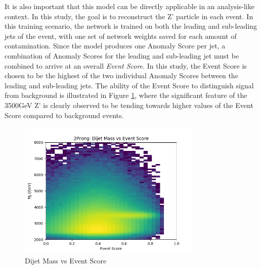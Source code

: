 \documentclass[12pt, a4paper]{article}
\begin{document}
It is also important that this model can be directly applicable in an analysis-like context. In this study, the goal is to reconstruct the Z' particle in each event. In this training scenario, the network is trained on both the leading and sub-leading jets of the event, with one set of network weights saved for each amount of contamination. Since the model produces one Anomaly Score per jet, a combination of Anomaly Scores for the leading and sub-leading jet must be combined to arrive at an overall \textit{Event Score}. In this study, the Event Score is chosen to be the highest of the two individual Anomaly Scores between the leading and sub-leading jets. The ability of the Event Score to distinguish signal from background is illustrated in Figure \ref{fig:mjj_vs_evscore}, where the significant feature of the 3500GeV Z' is clearly observed to be tending towards higher values of the Event Score compared to background events. 


\begin{figure}[H]
	\begin{center}
		\includegraphics[width=250pt]{imgs/ProcR_2Prong_Contaminated_10p0_2Prong_Contaminated_10p0_Weights_Event_ConstOnly_Avg_JJ_M_vs_Event_Score.png}
	\end{center}
	\caption{Dijet Mass vs Event Score}
	\label{fig:mjj_vs_evscore}
\end{figure}
\end{document}
